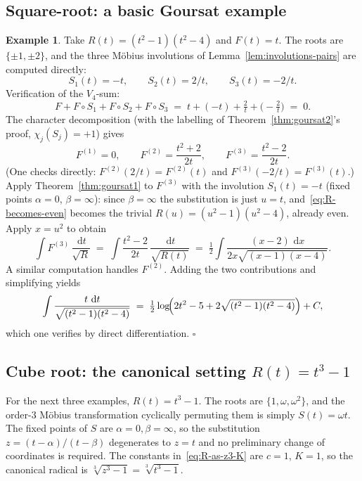 \documentclass[11pt,a4paper]{article}
\theoremstyle{plain}
\theoremstyle{definition}
\newtheorem{example}[theorem]{Example}
\theoremstyle{remark}
\renewcommand{\d}{\,\mathrm{d}}
\begin{document}
\subsection{Square-root: a basic Goursat example}

\begin{example}\label{ex:goursat-basic}
Take $R(t) = (t^2-1)(t^2-4)$ and $F(t)=t$. The roots are $\{\pm 1, \pm 2\}$, and the three M\"obius involutions of Lemma~\ref{lem:involutions-pairs} are computed directly:
\[
  S_1(t) = -t,\qquad S_2(t) = 2/t,\qquad S_3(t) = -2/t.
\]
Verification of the $V_4$-sum:
\[
  F + F\!\circ\! S_1 + F\!\circ\! S_2 + F\!\circ\! S_3 \;=\; t + (-t) + \tfrac{2}{t} + \bigl(-\tfrac{2}{t}\bigr) \;=\; 0.
\]
The character decomposition (with the labelling of Theorem~\ref{thm:goursat2}'s proof, $\chi_j(S_j)=+1$) gives
\[
  F^{(1)} = 0,\qquad F^{(2)} = \frac{t^2+2}{2t},\qquad F^{(3)} = \frac{t^2-2}{2t}.
\]
(One checks directly: $F^{(2)}(2/t) = F^{(2)}(t)$ and $F^{(3)}(-2/t) = F^{(3)}(t)$.) Apply Theorem~\ref{thm:goursat1} to $F^{(3)}$ with the involution $S_1(t)=-t$ (fixed points $\alpha=0$, $\beta=\infty$): since $\beta=\infty$ the substitution is just $u=t$, and~\eqref{eq:R-becomes-even} becomes the trivial $R(u) = (u^2-1)(u^2-4)$, already even. Apply $x = u^2$ to obtain
\[
  \int F^{(3)}\,\frac{\d t}{\sqrt{R}} \;=\; \int \frac{t^2-2}{2t}\,\frac{\d t}{\sqrt{R(t)}}
  \;=\; \tfrac{1}{2}\int \frac{(x-2)\,\d x}{2x\sqrt{(x-1)(x-4)}}.
\]
A similar computation handles $F^{(2)}$. Adding the two contributions and simplifying yields
\[
  \int \frac{t\,\d t}{\sqrt{(t^2-1)(t^2-4)}} \;=\; \tfrac{1}{2}\log\!\Bigl(2t^2 - 5 + 2\sqrt{(t^2-1)(t^2-4)}\Bigr) + C,
\]
which one verifies by direct differentiation. \hfill$\square$
\end{example}

\subsection{Cube root: the canonical setting $R(t)=t^3-1$}

For the next three examples, $R(t)=t^3-1$. The roots are $\{1,\omega,\omega^2\}$, and the order-$3$ M\"obius transformation cyclically permuting them is simply $S(t) = \omega t$. The fixed points of $S$ are $\alpha=0,\beta=\infty$, so the substitution $z=(t-\alpha)/(t-\beta)$ degenerates to $z=t$ and no preliminary change of coordinates is required. The constants in~\eqref{eq:R-as-z3-K} are $c=1$, $K=1$, so the canonical radical is $\sqrt[3]{z^3-1}=\sqrt[3]{t^3-1}$.
\end{document}
